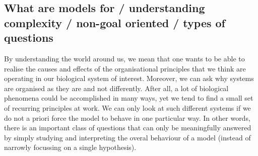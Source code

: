 \subsection{What are models for / understanding complexity / non-goal oriented / types of questions}

By understanding the world around us, we mean that one wants to be able to realise the causes and effects of the organisational principles that we think are operating in our biological system of interest. Moreover, we can ask why systems are organised as they are and not differently. After all, a lot of biological phenomena could be accomplished in many ways, yet we tend to find a small set of recurring principles at work. We can only look at such different systems if we do not a priori force the model to behave in one particular way. In other words, there is an important class of questions that can only be meaningfully answered by simply studying and interpreting the overal behaviour of a model (instead of narrowly focussing on a single hypothesis).
  
  